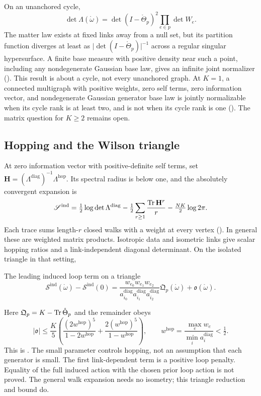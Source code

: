 On an unanchored cycle,
\[
\det\Lambda(\mathring\omega)=\det(I-\mathring\Theta_p)^2\prod_{e\in p}\det W_e.
\]
The matter law exists at fixed links away from a null set, but its partition function diverges
at least as \(\lvert\det(I-\mathring\Theta_p)\rvert^{-1}\) across a regular singular hypersurface. A
finite base measure with positive density near such a point, including any nondegenerate Gaussian
base law, gives an infinite joint normalizer (). This result is
about a cycle, not every unanchored graph. At \(K=1\), a connected multigraph with positive
weights, zero self terms, zero information vector, and nondegenerate Gaussian generator base law
is jointly normalizable when its cycle rank is at least two, and is not when its cycle rank is
one (). The matrix question for \(K\geq2\) remains open.

\subsection{Hopping and the Wilson triangle}

At zero information vector with positive-definite self terms, set
\(\mathbf H=(\Lambda^{\mathrm{diag}})^{-1}\Lambda^{\mathrm{hop}}\). Its spectral radius is below
one, and the absolutely convergent expansion is
\[
\mathscr S^{\mathrm{ind}}=\tfrac12\log\det\Lambda^{\mathrm{diag}}
-\tfrac12\sum_{r\geq1}\frac{\operatorname{Tr}\mathbf H^r}{r}-\tfrac{NK}{2}\log2\pi.
\]
Each trace sums length-\(r\) closed walks with a weight at every vertex
(). In general these are weighted matrix products. Isotropic data and
isometric links give scalar hopping ratios and a link-independent diagonal determinant. On the
isolated triangle in that setting,
\begin{keyequation}{The leading induced loop term on a triangle}
\[
\mathscr S^{\mathrm{ind}}(\mathring\omega)-\mathscr S^{\mathrm{ind}}(0)
=\frac{w_{e_0}w_{e_1}w_{e_2}}
{a^{\mathrm{diag}}_{i_0}a^{\mathrm{diag}}_{i_1}a^{\mathrm{diag}}_{i_2}}
\mathfrak Q_p(\mathring\omega)+\mathfrak o(\mathring\omega).
\]
\end{keyequation}
Here \(\mathfrak Q_p=K-\operatorname{Tr}\mathring\Theta_p\) and the remainder obeys
\[
\lvert\mathfrak o\rvert\leq\frac K5\left(
\frac{(2w^{\mathrm{hop}})^5}{1-2w^{\mathrm{hop}}}
+\frac{2(w^{\mathrm{hop}})^5}{1-w^{\mathrm{hop}}}\right),
\qquad w^{\mathrm{hop}}=\frac{\max_e w_e}{\min_i a_i^{\mathrm{diag}}}<\tfrac12.
\]
This is . The small parameter controls hopping, not an assumption
that each generator is small. The first link-dependent term is a positive loop penalty. Equality
of the full induced action with the chosen prior loop action is not proved. The general walk
expansion needs no isometry; this triangle reduction and bound do.

